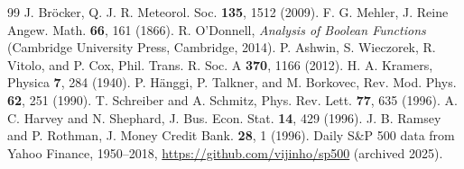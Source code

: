 \begin{thebibliography}{99}
 J. Br\"ocker, Q. J. R. Meteorol. Soc. \textbf{135}, 1512 (2009).
 F. G. Mehler, J. Reine Angew. Math. \textbf{66}, 161 (1866).
 R. O'Donnell, \textit{Analysis of Boolean Functions} (Cambridge University Press, Cambridge, 2014).
 P. Ashwin, S. Wieczorek, R. Vitolo, and P. Cox, Phil. Trans. R. Soc. A \textbf{370}, 1166 (2012).
 H. A. Kramers, Physica \textbf{7}, 284 (1940).
 P. H\"anggi, P. Talkner, and M. Borkovec, Rev. Mod. Phys. \textbf{62}, 251 (1990).
 T. Schreiber and A. Schmitz, Phys. Rev. Lett. \textbf{77}, 635 (1996).
 A. C. Harvey and N. Shephard, J. Bus. Econ. Stat. \textbf{14}, 429 (1996).
 J. B. Ramsey and P. Rothman, J. Money Credit Bank. \textbf{28}, 1 (1996).
 Daily S\&P 500 data from Yahoo Finance, 1950--2018, \url{https://github.com/vijinho/sp500} (archived 2025).
\end{thebibliography}
